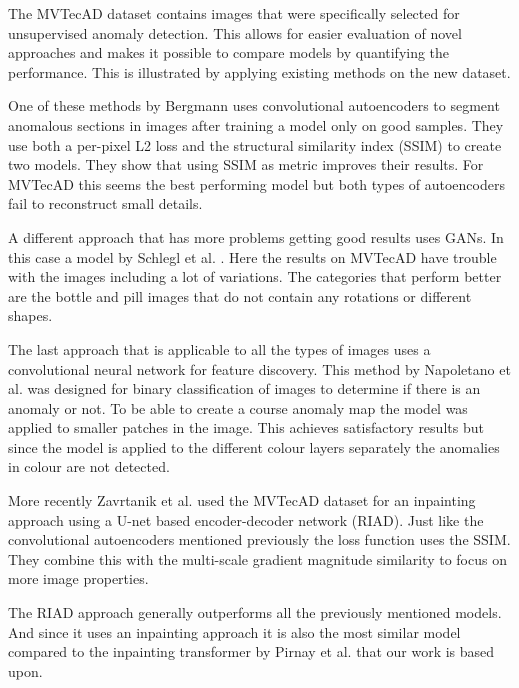 The MVTecAD dataset contains images that were specifically selected for unsupervised anomaly detection. This allows for easier evaluation of novel approaches and makes it possible to compare models by quantifying the performance. This is illustrated by applying existing methods on the new dataset.

One of these methods by Bergmann \cite{bergmann_improving_2019} uses convolutional autoencoders to segment anomalous sections in images after training a model only on good samples. They use both a per-pixel L2 loss and the structural similarity index (SSIM) to create two models. They show that using SSIM as metric improves their results. For MVTecAD this seems the best performing model but both types of autoencoders fail to reconstruct small details.

A different approach that has more problems getting good results uses GANs. In this case a model by Schlegl et al. \cite{schlegl_unsupervised_2017}. Here the results on MVTecAD have trouble with the images including a lot of variations. The categories that perform better are the bottle and pill images that do not contain any rotations or different shapes.

The last approach that is applicable to all the types of images uses a convolutional neural network for feature discovery. This method by Napoletano et al. \cite{napoletano_anomaly_2018}   was designed for binary classification of images to determine if there is an anomaly or not. To be able to create a course anomaly map the model was applied to smaller patches in the image. This achieves satisfactory results but since the model is applied to the different colour layers separately the anomalies in colour are not detected.

More recently Zavrtanik et al. \cite{zavrtanik_reconstruction_2021} used the MVTecAD dataset for an inpainting approach using a U-net based encoder-decoder network (RIAD). Just like the convolutional autoencoders mentioned previously the loss function uses the SSIM. They combine this with the multi-scale gradient magnitude similarity \cite{xue_gradient_2014} to focus on more image properties.

The RIAD approach generally outperforms all the previously mentioned models. And since it uses an inpainting approach it is also the most similar model compared to the inpainting transformer by Pirnay et al. \cite{pirnay_inpainting_2021} that our work is based upon.

